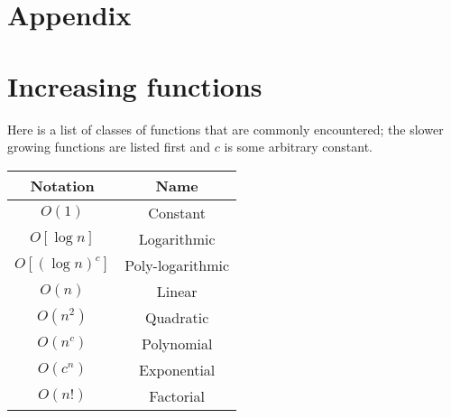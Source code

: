 \documentclass[12pt, a4paper]{article}
\begin{document}

\pagebreak

\appendix

\section*{Appendix}

\section{Increasing functions}

Here is a list of classes of functions that are commonly encountered; the slower growing functions are listed first and \(c\) is some arbitrary constant.

\begin{table}[H]
    \begin{center}
        \begin{tabular}{c|c}
            \textbf{Notation} & \textbf{Name}  \\ \hline
            \(O(1)\) & Constant \\
            \(O[\log n]\) & Logarithmic \\
            \(O[(\log n)^c]\) & Poly-logarithmic \\
            \(O(n)\)& Linear \\
            \(O(n^2)\) & Quadratic \\
            \(O(n^c)\) & Polynomial \\
            \(O(c^n)\) & Exponential \\
            \(O(n!)\) & Factorial       
            \end{tabular}    
    \end{center}
\end{table}
\end{document}

